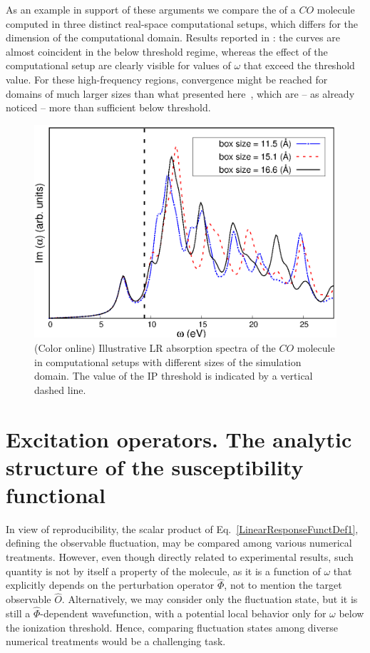 \documentclass[reprint,aps,prb]{revtex4-1}
\newcommand{\op}[1]{\hat {#1}}
\begin{document}
As an example in support of these arguments we compare the  of a $CO$ molecule computed in three distinct real-space computational setups, which differs for the dimension of the computational domain.
Results reported in : the curves are almost coincident in the below threshold regime,
whereas the effect of the computational setup are clearly visible for values of $\omega$ that exceed the threshold value.
For these high-frequency regions, convergence might be reached for domains of much larger sizes than what presented here~\cite{baroni2008},
which are -- as already noticed -- more than sufficient below threshold.

\begin{figure}
\includegraphics[scale=0.6]{Fig2_CO_spectrum.eps}
\caption{\label{co_spectrum}(Color online) Illustrative LR absorption spectra of the $CO$ molecule in computational setups with different sizes of the simulation domain. The value of the IP threshold is indicated by a vertical dashed line.}
\end{figure}

\section{Excitation operators. The analytic structure of the susceptibility functional}

In view of reproducibility, the scalar product of Eq.~\eqref{LinearResponseFunctDef1}, defining the observable fluctuation, may be compared among various numerical treatments.
However, even though directly related to experimental results, such quantity is not by itself a property of the molecule, as it is a function of $\omega$ that explicitly depends
on the perturbation operator $\op \Phi$, not to mention the target observable $\op O$. Alternatively, we may consider only the fluctuation state, but it is still a $\op \Phi$-dependent wavefunction,
with a potential local behavior only for $\omega$ below the ionization threshold. Hence, comparing fluctuation states among diverse numerical treatments would be a
challenging task.
\end{document}
